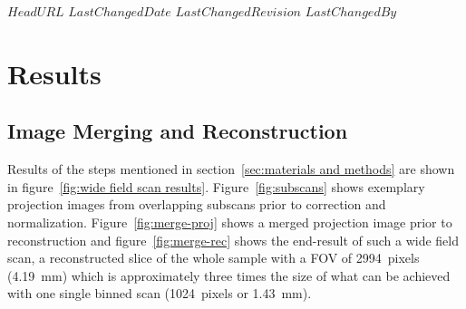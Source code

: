 \svnidlong
{$HeadURL$}
{$LastChangedDate$}
{$LastChangedRevision$}
{$LastChangedBy$}

\begin{center}
\end{center}

\section{Results}
\label{sec:Results}
\subsection{Image Merging and Reconstruction}
\label{sec:Image Merging and Reconstruction}
Results of the steps mentioned in section~\ref{sec:materials and methods} are shown in figure~\ref{fig:wide field scan results}. Figure~\ref{fig:subscans} shows exemplary projection images from overlapping subscans prior to correction and normalization. Figure~\ref{fig:merge-proj} shows a merged projection image prior to reconstruction and figure~\ref{fig:merge-rec} shows the end-result of such a wide field scan, a reconstructed slice of the whole sample with a FOV of \SI{2994}{pixels} (\SI{4.19}{\milli\meter}) which is approximately three times the size of what can be achieved with one single binned scan (\SI{1024}{pixels} or \SI{1.43}{\milli\meter}).

